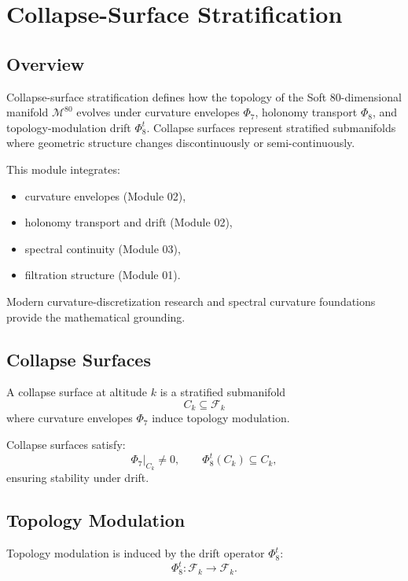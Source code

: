 
\section{Collapse-Surface Stratification}
\label{sec:CollapseSurfaceStratification}

\subsection{Overview}
Collapse-surface stratification defines how the topology of the Soft
80-dimensional manifold $\mathcal{M}^{80}$ evolves under curvature envelopes
$\Phi_7$, holonomy transport $\Phi_8$, and topology-modulation drift
$\Phi_8^t$. Collapse surfaces represent stratified submanifolds where geometric
structure changes discontinuously or semi-continuously.

This module integrates:
\begin{itemize}
    \item curvature envelopes (Module 02),
    \item holonomy transport and drift (Module 02),
    \item spectral continuity (Module 03),
    \item filtration structure (Module 01).
\end{itemize}

Modern curvature-discretization research
and spectral curvature foundations
provide the mathematical grounding.

\subsection{Collapse Surfaces}
\begin{definition}
A collapse surface at altitude $k$ is a stratified submanifold
\[
C_k \subseteq \mathcal{F}_k
\]
where curvature envelopes $\Phi_7$ induce topology modulation.
\end{definition}

Collapse surfaces satisfy:
\[
\Phi_7|_{C_k} \neq 0,
\qquad
\Phi_8^t(C_k) \subseteq C_k,
\]
ensuring stability under drift.

\subsection{Topology Modulation}
Topology modulation is induced by the drift operator $\Phi_8^t$:
\[
\Phi_8^t : \mathcal{F}_k \to \mathcal{F}_k.
\]

